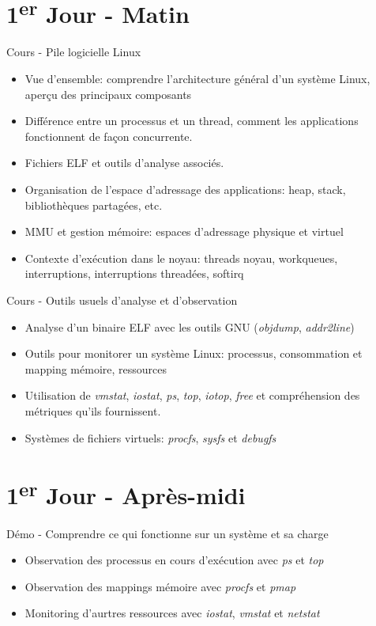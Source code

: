 \documentclass[a4paper,12pt,obeyspaces,spaces,hyphens]{article}
\begin{document}
\section{1\textsuperscript{er} Jour - Matin}

\feagendaonecolumn
{Cours - Pile logicielle Linux}
{
  \begin{itemize}
  \item Vue d'ensemble: comprendre l'architecture général d'un système
    Linux, aperçu des principaux composants
  \item Différence entre un processus et un thread, comment les
    applications fonctionnent de façon concurrente.
  \item Fichiers ELF et outils d'analyse associés.
  \item Organisation de l'espace d'adressage des applications: heap,
    stack, bibliothèques partagées, etc.
  \item MMU et gestion mémoire: espaces d'adressage physique et
    virtuel
  \item Contexte d'exécution dans le noyau: threads noyau, workqueues,
    interruptions, interruptions threadées, softirq
  \end{itemize}
}

\feagendaonecolumn
{Cours - Outils usuels d'analyse et d'observation}
{
  \begin{itemize}
  \item Analyse d'un binaire ELF avec les outils GNU ({\em objdump},
    {\em addr2line})
  \item Outils pour monitorer un système Linux: processus,
    consommation et mapping mémoire, ressources
  \item Utilisation de {\em vmstat}, {\em iostat}, {\em ps}, {\em
      top}, {\em iotop}, {\em free} et compréhension des métriques
    qu'ils fournissent.
  \item Systèmes de fichiers virtuels: {\em procfs}, {\em sysfs} et
    {\em debugfs}
  \end{itemize}
}

\section{1\textsuperscript{er} Jour - Après-midi}

\feagendaonecolumn
{Démo - Comprendre ce qui fonctionne sur un système et sa charge}
{
  \begin{itemize}
  \item Observation des processus en cours d'exécution avec {\em ps} et {\em top}
  \item Observation des mappings mémoire avec {\em procfs} et {\em pmap}
  \item Monitoring d'aurtres ressources avec {\em iostat}, {\em
      vmstat} et {\em netstat}
 \end{itemize}
}
\end{document}
